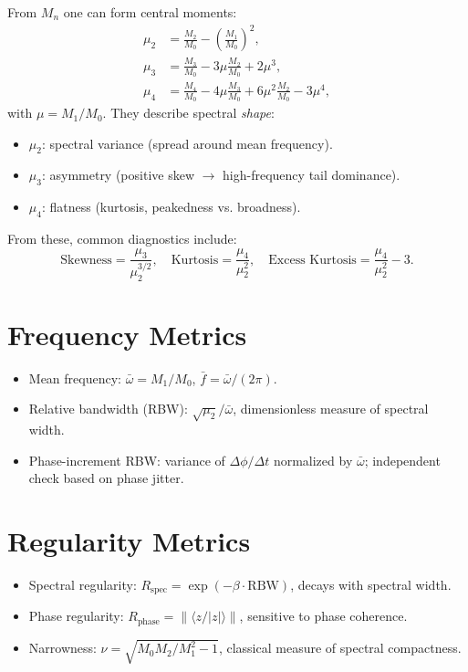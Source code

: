 \documentclass[11pt]{article}
\begin{document}
From $M_n$ one can form central moments:
\begin{align}
\mu_2 &= \frac{M_2}{M_0} - \left(\frac{M_1}{M_0}\right)^2, \\
\mu_3 &= \frac{M_3}{M_0} - 3\mu\frac{M_2}{M_0} + 2\mu^3, \\
\mu_4 &= \frac{M_4}{M_0} - 4\mu\frac{M_3}{M_0} + 6\mu^2 \frac{M_2}{M_0} - 3\mu^4,
\end{align}
with $\mu = M_1/M_0$.  
They describe spectral \emph{shape}:
\begin{itemize}
  \item $\mu_2$: spectral variance (spread around mean frequency).
  \item $\mu_3$: asymmetry (positive skew $\to$ high-frequency tail dominance).
  \item $\mu_4$: flatness (kurtosis, peakedness vs. broadness).
\end{itemize}

From these, common diagnostics include:
\[
\text{Skewness} = \frac{\mu_3}{\mu_2^{3/2}}, \quad
\text{Kurtosis} = \frac{\mu_4}{\mu_2^2}, \quad
\text{Excess Kurtosis} = \frac{\mu_4}{\mu_2^2} - 3.
\]

\section{Frequency Metrics}

\begin{itemize}
  \item Mean frequency: $\bar{\omega} = M_1/M_0$, $\bar{f} = \bar{\omega}/(2\pi)$.
  \item Relative bandwidth (RBW): $\sqrt{\mu_2}/\bar{\omega}$, dimensionless measure of spectral width.
  \item Phase-increment RBW: variance of $\Delta\phi/\Delta t$ normalized by $\bar{\omega}$; independent check based on phase jitter.
\end{itemize}

\section{Regularity Metrics}

\begin{itemize}
  \item Spectral regularity: $R_{\text{spec}} = \exp(-\beta\cdot \text{RBW})$, decays with spectral width.
  \item Phase regularity: $R_{\text{phase}} = \|\langle z/|z|\rangle\|$, sensitive to phase coherence.
  \item Narrowness: $\nu = \sqrt{M_0 M_2/M_1^2 - 1}$, classical measure of spectral compactness.
\end{itemize}
\end{document}
